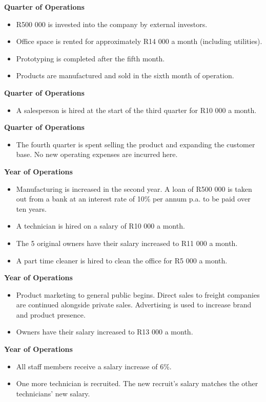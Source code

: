 {\bfseries {} Quarter of Operations}
\begin{itemize}
\item R500 000 is invested into the company by external investors.
\item Office space is rented for approximately R14 000 a month (including utilities).
\item Prototyping is completed after the fifth month.
\item Products are manufactured and sold in the sixth month of operation.
\end{itemize}

{\bfseries {} Quarter of Operations}
\begin{itemize}
\item A salesperson is hired at the start of the third quarter for R10 000 a month.
\end{itemize}

{\bfseries {} Quarter of Operations}
\begin{itemize}
\item The fourth quarter is spent selling the product and expanding the customer base. No new operating expenses are incurred here.
\end{itemize}

{\bfseries {} Year of Operations}
\begin{itemize}
\item Manufacturing is increased in the second year. A loan of R500 000 is taken out from a bank at an interest rate of 10\% per annum p.a. to be paid over ten years. 
\item A technician is hired on a salary of R10 000 a month.
\item The 5 original owners have their salary increased to R11 000 a month.
\item A part time cleaner is hired to clean the office for R5 000 a month.
\end{itemize}
\pagebreak
{\bfseries {} Year of Operations}
\begin{itemize}
\item Product marketing to general public begins. Direct sales to freight companies are continued alongside private sales. Advertising is used to increase brand and product presence.
\item Owners have their salary increased to R13 000 a month.
\end{itemize}

{\bfseries {} Year of Operations}
\begin{itemize}
\item All staff members receive a salary increase of 6\%.
\item One more technician is recruited. The new recruit's salary matches the other technicians' new salary.
\end{itemize}

